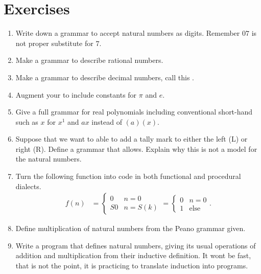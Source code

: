 \section*{Exercises}
\begin{enumerate}
    \item Write down a grammar to accept natural numbers as digits.  Remember $07$ is not proper substitute for $7$.
    \item Make a grammar to describe rational numbers.
    \item Make a grammar to describe decimal numbers, call this .  
    \item Augment your  to include constants for $\pi$ and $e$.
    \item Give a full grammar for real polynomials including conventional short-hand 
    such as $x$ for $x^1$ and $ax$ instead of $(a)(x)$.
    
    \item Suppose that we want to able to add a tally mark to either the left (L) or right (R).
    Define a grammar that allows.  Explain why this is not a model for the natural numbers.
        
    \item Turn the following function into code in both functional and procedural dialects.
    \begin{align*}
        f(n) & = \begin{cases}
                    0 & n=0\\
                    S0 & n=S(k)
        \end{cases}
         =\begin{cases} 0 & n=0 \\ 1 & \text{else}\end{cases}.
    \end{align*}
    
    \item Define multiplication of natural numbers from the Peano grammar given.
    
    \item Write a program that defines natural numbers, giving its usual operations of addition 
    and multiplication from their inductive definition.  It wont be fast, that is not the point,
    it is practicing to translate induction into programs.
\end{enumerate}